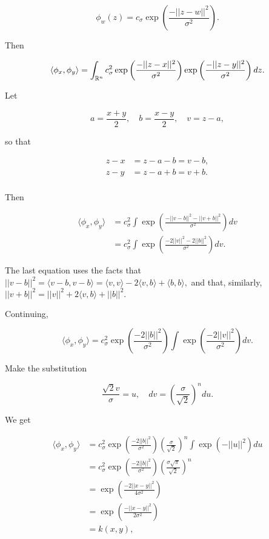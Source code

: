 \documentclass[]{article}
\begin{document}
\[\phi_w(z) = c_\sigma\exp\left(\frac{-||z-w||^2}{\sigma^2}\right).\]

Then

\[\langle\phi_x, \phi_y\rangle
  = \int_{\mathbb{R}^n} c_\sigma^2
    \exp\left(\frac{-||z-x||^2}{\sigma^2}\right)
    \exp\left(\frac{-||z-y||^2}{\sigma^2}\right) dz.\]

Let

\[a = \frac{x+y}{2}, \quad
  b = \frac{x-y}{2}, \quad
  v = z - a,\]

so that

\[\begin{aligned}
z-x & = z - a - b = v - b, \\
z-y & = z - a + b = v + b. \\
\end{aligned}\]

Then

\[\begin{aligned}
\langle\phi_x, \phi_y\rangle
  & = c_\sigma^2\int
      \exp\left(\frac{-||v-b||^2 - ||v+b||^2}{\sigma^2}\right) dv \\
  & = c_\sigma^2 \int \exp\left(\frac{-2||v||^2 - 2||b||^2}{\sigma^2}\right)dv.
\end{aligned}\]

The last equation uses the facts that
\(||v-b||^2 = \langle v-b, v-b\rangle = \langle v, v\rangle - 2\langle v, b\rangle + \langle b, b\rangle,\)
and that, similarly,
\(||v+b||^2 = ||v||^2 + 2\langle v, b\rangle + ||b||^2.\)

Continuing,

\[\langle\phi_x, \phi_y\rangle
  = c_\sigma^2 \exp\left(\frac{-2||b||^2}{\sigma^2}\right)
    \int\exp\left(\frac{-2||v||^2}{\sigma^2}\right) dv.\]

Make the substitution

\[\frac{\sqrt 2 v}{\sigma} = u, \quad
  dv = \left(\frac{\sigma}{\sqrt 2}\right)^n du.\]

We get

\[\begin{aligned}
\langle\phi_x, \phi_y\rangle
  & = c_\sigma^2 \exp\left(\frac{-2||b||^2}{\sigma^2}\right)
      \left(\frac{\sigma}{\sqrt 2}\right)^n
      \int \exp(-||u||^2) du  \\
  & = c_\sigma^2 \exp\left(\frac{-2||b||^2}{\sigma^2}\right)
      \left(\frac{\sigma\sqrt\pi}{\sqrt 2}\right)^n \\
  & = \exp\left(\frac{-2||x-y||^2}{4\sigma^2}\right) \\
  & = \exp\left(\frac{-||x-y||^2}{2\sigma^2}\right) \\
  & = k(x, y),
\end{aligned}\]
\end{document}
